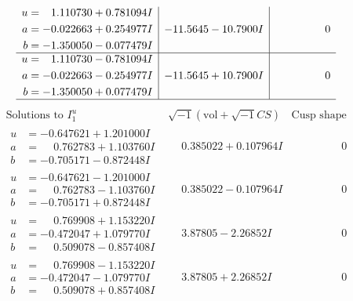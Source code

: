\documentclass[1p]{elsarticle_modified}
\theoremstyle{definition}
\newcommand{\I}{\sqrt{-1}}
\begin{document}
$$\begin{array}{c|c|c}
\begin{aligned}
u &= \phantom{-}1.110730 + 0.781094 I \\
a &= -0.022663 + 0.254977 I \\
b &= -1.350050 - 0.077479 I\end{aligned}
 & -11.5645 - 10.7900 I & \phantom{-0.000000 } 0 \\ \hline\begin{aligned}
u &= \phantom{-}1.110730 - 0.781094 I \\
a &= -0.022663 - 0.254977 I \\
b &= -1.350050 + 0.077479 I\end{aligned}
 & -11.5645 + 10.7900 I & \phantom{-0.000000 } 0\\
 \hline 
 \end{array}$$\newpage$$\begin{array}{c|c|c}  
\text{Solutions to }I^u_{1}& \I (\text{vol} + \sqrt{-1}CS) & \text{Cusp shape}\\
 \hline 
\begin{aligned}
u &= -0.647621 + 1.201000 I \\
a &= \phantom{-}0.762783 + 1.103760 I \\
b &= -0.705171 - 0.872448 I\end{aligned}
 & \phantom{-}0.385022 + 0.107964 I & \phantom{-0.000000 } 0 \\ \hline\begin{aligned}
u &= -0.647621 - 1.201000 I \\
a &= \phantom{-}0.762783 - 1.103760 I \\
b &= -0.705171 + 0.872448 I\end{aligned}
 & \phantom{-}0.385022 - 0.107964 I & \phantom{-0.000000 } 0 \\ \hline\begin{aligned}
u &= \phantom{-}0.769908 + 1.153220 I \\
a &= -0.472047 + 1.079770 I \\
b &= \phantom{-}0.509078 - 0.857408 I\end{aligned}
 & \phantom{-}3.87805 - 2.26852 I & \phantom{-0.000000 } 0 \\ \hline\begin{aligned}
u &= \phantom{-}0.769908 - 1.153220 I \\
a &= -0.472047 - 1.079770 I \\
b &= \phantom{-}0.509078 + 0.857408 I\end{aligned}
 & \phantom{-}3.87805 + 2.26852 I & \phantom{-0.000000 } 0 \\ \hline\begin{aligned}

\end{aligned}
\end{array}$$
\end{document}
